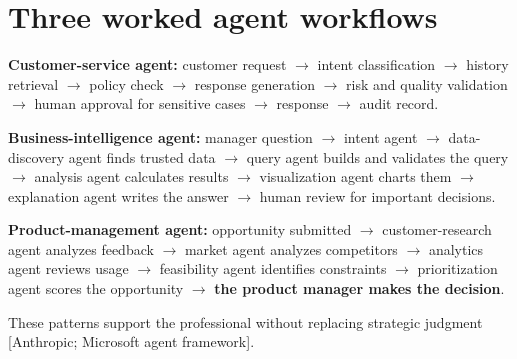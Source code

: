 \section{Three worked agent workflows}

\textbf{Customer-service agent:} customer request $\rightarrow$ intent
classification $\rightarrow$ history retrieval $\rightarrow$ policy check
$\rightarrow$ response generation $\rightarrow$ risk and quality validation
$\rightarrow$ human approval for sensitive cases $\rightarrow$ response
$\rightarrow$ audit record.

\textbf{Business-intelligence agent:} manager question $\rightarrow$ intent
agent $\rightarrow$ data-discovery agent finds trusted data $\rightarrow$
query agent builds and validates the query $\rightarrow$ analysis agent
calculates results $\rightarrow$ visualization agent charts them
$\rightarrow$ explanation agent writes the answer $\rightarrow$ human review
for important decisions.

\textbf{Product-management agent:} opportunity submitted $\rightarrow$
customer-research agent analyzes feedback $\rightarrow$ market agent analyzes
competitors $\rightarrow$ analytics agent reviews usage $\rightarrow$
feasibility agent identifies constraints $\rightarrow$ prioritization agent
scores the opportunity $\rightarrow$ \textbf{the product manager makes the
decision}.

These patterns support the professional without replacing strategic judgment
[Anthropic; Microsoft agent framework].
